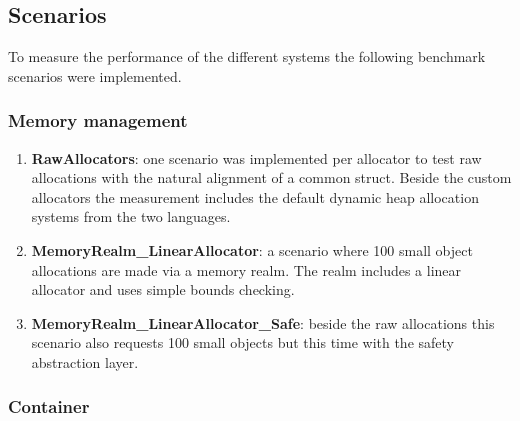 \subsection{Scenarios}

To measure the performance of the different systems the following benchmark scenarios were implemented. 

\subsubsection{Memory management}

\begin{enumerate}
	\item \textbf{RawAllocators}: one scenario was implemented per allocator to test raw allocations with the natural alignment of a common struct. Beside the custom allocators the measurement includes the default dynamic heap allocation systems from the two languages.
	
	\item \textbf{MemoryRealm\_LinearAllocator}: a scenario where 100 small object allocations are made via a memory realm. The realm includes a linear allocator and uses simple bounds checking.
	
	\item \textbf{MemoryRealm\_LinearAllocator\_Safe}: beside the raw allocations this scenario also requests 100 small objects but this time with the safety abstraction layer.
\end{enumerate}

\subsubsection{Container}

